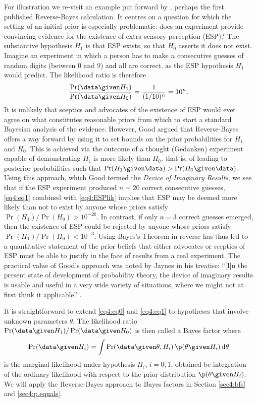 For illustration we re-visit an example put forward by \citet[p. 35]{Good1950},
perhaps the first published Reverse-Bayes calculation. It centres on a question
for which the setting of an initial prior is especially problematic: does an
experiment provide convincing evidence for the existence of extra-sensory
perception (ESP)? The substantive hypothesis $H_{1}$ is that ESP exists, so that
$H_{0}$ asserts it does not exist. Imagine an experiment in which a person has
to make $n$ consecutive guesses of random digits (between 0 and 9) and all are
correct, as the ESP hypothesis $H_{1}$ would predict. The likelihood ratio is
therefore
\begin{equation}\label{eq4:ESPlik}
   \frac{\Pr(\data \given H_{1})}{\Pr(\data \given H_{0})} = \frac{1}{(1/10)^n} = 10^n .
\end{equation}
It is unlikely that sceptics and advocates of the existence of ESP would ever
agree on what constitutes reasonable priors from which to start a standard
Bayesian analysis of the evidence. However, Good argued that Reverse-Bayes
offers a way forward by using it to set bounds on the prior probabilities for
$H_{1}$ and $H_{0}$. This is achieved via the outcome of a thought (Gedanken)
experiment capable of demonstrating $H_{1}$ is more likely than $H_{0}$, that
is, of leading to posterior probabilities such that
$\Pr(H_1 \given \data) > \Pr(H_0 \given \data)$. Using this approach, which Good
termed the \emph{Device of Imaginary Results}, we see that if the ESP experiment
produced $n=20$ correct consecutive guesses, \eqref{eq4:eq1} combined with
\eqref{eq4:ESPlik} implies that ESP may be deemed more likely than not to exist
by anyone whose priors satisfy ${\Pr(H_{1})}/{\Pr(H_{0})} > 10^{-20}$. In
contrast, if only $n = 3$ correct guesses emerged, then the existence of ESP
could be rejected by anyone whose priors satisfy
${\Pr(H_{1})}/{\Pr(H_{0})} < 10^{-3}$. Using Bayes's Theorem in reverse has thus
led to a quantitative statement of the prior beliefs that either advocates or
sceptics of ESP must be able to justify in the face of results from a real
experiment. The practical value of Good's approach was noted by Jaynes in his
treatise: ``[I]n the present state of development of probability theory, the
device of imaginary results is usable and useful in a very wide variety of
situations, where we might not at first think it applicable''
\citep[p. 125--126]{Jaynes2003}.

It is straightforward to extend \eqref{eq4:eq0} and \eqref{eq4:eq1} to hypotheses
that involve unknown parameters $\theta$. The likelihood ratio
$\Pr(\data \given H_{1})/\Pr(\data \given H_{0})$ is then called a Bayes factor
\citep{Jeffreys1961, Kass1995} where
\begin{equation*}
  \Pr(\data \given H_{i}) = \int \Pr(\data \given \theta, H_{i})\,
  \p(\theta \given H_{i}) \,\mathrm{d} \theta
\end{equation*}
is the marginal likelihood under hypothesis $H_i$, $i=0,1$, obtained be
integration of the ordinary likelihood with respect to the prior distribution
$\p(\theta \given H_i)$. We will apply the Reverse-Bayes approach to Bayes
factors in Section \ref{sec4:bfs} and \ref{sec4:p.equals}.


